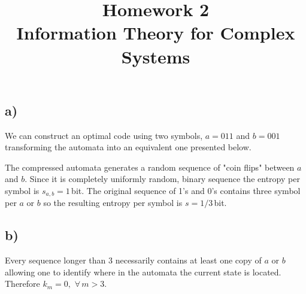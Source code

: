 \documentclass[a4paper, 12pt]{article}
\begin{document}
\title{\vspace{-6em}\textbf{Homework 2}\\ \Large Information Theory for Complex Systems \vspace{-1em}}
\author{}
\date{\vspace{-3.2em}}


\maketitle

\subsection*{a)}
We can construct an optimal code using two symbols, $a = 011$ and $b = 001$ transforming the automata into an equivalent one presented below.

\begin{figure}[ht]
\begin{center}
\end{center}
\end{figure}

The compressed automata generates a random sequence of "coin flips" between $a$ and $b$. Since it is completely uniformly random, binary sequence the entropy per symbol is $s_{a,b} = 1\,$bit. The original sequence of 1's and 0's contains three symbol per $a$ or $b$ so the resulting entropy per symbol is $s = 1/3\,$bit.

\subsection*{b)}
Every sequence longer than 3 necessarily contains at least one copy of $a$ or $b$ allowing one to identify where in the automata the current state is located. Therefore $k_m = 0,\,\, \forall\, m > 3$.
\end{document}
